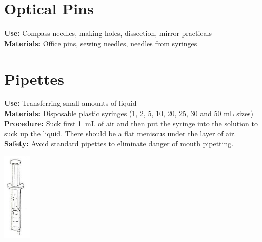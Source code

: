 \begin{multicols}{2}

\section{Optical Pins}
\label{sec:optical-pins}
\vspace{-10pt}
\textbf{Use:} Compass needles, making holes, dissection, mirror practicals\\
\textbf{Materials:} Office pins, sewing needles, needles from syringes

\section{Pipettes}
\label{sec:pipettes}
\vspace{-10pt}
\textbf{Use:} Transferring small amounts of liquid\\
\textbf{Materials:} Disposable plastic syringes (1, 2, 5, 10, 20, 25, 30 and 50 mL sizes)\\
\textbf{Procedure:} Suck first 1~mL of air and then put the syringe into the solution to suck up the liquid. There should be a flat meniscus under the layer of air.\\
\textbf{Safety:} Avoid standard pipettes to eliminate danger of mouth pipetting.
\begin{center}
\includegraphics[width=0.1\textwidth]{./img/source/syringe.jpg}
\end{center}



\end{multicols}
